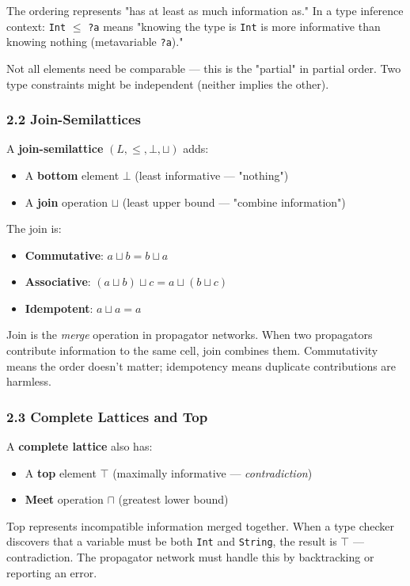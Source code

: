 \documentclass[11pt]{article}
\begin{document}
The ordering represents "has at least as much information as." In a type
inference context: \texttt{Int} \(\leq\) \texttt{?a} means "knowing the type is \texttt{Int}
is more informative than knowing nothing (metavariable \texttt{?a})."

Not all elements need be comparable --- this is the "partial" in partial
order. Two type constraints might be independent (neither implies the other).
\subsubsection{2.2 Join-Semilattices}
\label{sec:orgd993916}

A \textbf{join-semilattice} \((L, \leq, \bot, \sqcup)\) adds:

\begin{itemize}
\item A \textbf{bottom} element \(\bot\) (least informative --- "nothing")
\item A \textbf{join} operation \(\sqcup\) (least upper bound --- "combine information")
\end{itemize}

The join is:
\begin{itemize}
\item \textbf{Commutative}: \(a \sqcup b = b \sqcup a\)
\item \textbf{Associative}: \((a \sqcup b) \sqcup c = a \sqcup (b \sqcup c)\)
\item \textbf{Idempotent}: \(a \sqcup a = a\)
\end{itemize}

Join is the \emph{merge} operation in propagator networks. When two propagators
contribute information to the same cell, join combines them. Commutativity
means the order doesn't matter; idempotency means duplicate contributions
are harmless.
\subsubsection{2.3 Complete Lattices and Top}
\label{sec:orgc32f835}

A \textbf{complete lattice} also has:
\begin{itemize}
\item A \textbf{top} element \(\top\) (maximally informative --- \emph{contradiction})
\item \textbf{Meet} operation \(\sqcap\) (greatest lower bound)
\end{itemize}

Top represents incompatible information merged together. When a type
checker discovers that a variable must be both \texttt{Int} and \texttt{String}, the
result is \(\top\) --- contradiction. The propagator network must handle this
by backtracking or reporting an error.
\end{document}
